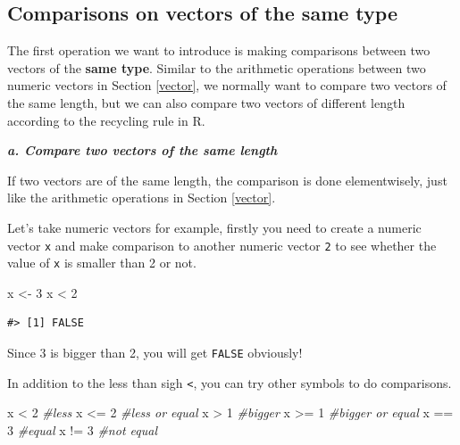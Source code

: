 \documentclass[
]{book}
\newenvironment{Shaded}{\begin{snugshade}}{\end{snugshade}}
\newcommand{\CommentTok}[1]{\textcolor[rgb]{0.56,0.35,0.01}{\textit{#1}}}
\newcommand{\DecValTok}[1]{\textcolor[rgb]{0.00,0.00,0.81}{#1}}
\newcommand{\NormalTok}[1]{#1}
\newcommand{\OtherTok}[1]{\textcolor[rgb]{0.56,0.35,0.01}{#1}}
\newcommand{\SpecialCharTok}[1]{\textcolor[rgb]{0.00,0.00,0.00}{#1}}
\begin{document}
\hypertarget{comparisons-on-vectors-of-the-same-type}{%
\subsection{Comparisons on vectors of the same type}\label{comparisons-on-vectors-of-the-same-type}}

The first operation we want to introduce is making comparisons between two vectors of the \textbf{same type}. Similar to the arithmetic operations between two numeric vectors in Section \ref{vector}, we normally want to compare two vectors of the same length, but we can also compare two vectors of different length according to the recycling rule in R.

\textbf{\emph{a. Compare two vectors of the same length}}

If two vectors are of the same length, the comparison is done elementwisely, just like the arithmetic operations in Section \ref{vector}.

Let's take numeric vectors for example, firstly you need to create a numeric vector \texttt{x} and make comparison to another numeric vector \texttt{2} to see whether the value of \texttt{x} is smaller than 2 or not.

\begin{Shaded}
\begin{Highlighting}[]
\NormalTok{x }\OtherTok{\textless{}{-}} \DecValTok{3}
\NormalTok{x }\SpecialCharTok{\textless{}} \DecValTok{2}
\end{Highlighting}
\end{Shaded}

\begin{verbatim}
#> [1] FALSE
\end{verbatim}

Since 3 is bigger than 2, you will get \texttt{FALSE} obviously!

In addition to the less than sigh \texttt{\textless{}}, you can try other symbols to do comparisons.

\begin{Shaded}
\begin{Highlighting}[]
\NormalTok{x }\SpecialCharTok{\textless{}} \DecValTok{2}      \CommentTok{\#less}
\NormalTok{x }\SpecialCharTok{\textless{}=} \DecValTok{2}     \CommentTok{\#less or equal}
\NormalTok{x }\SpecialCharTok{\textgreater{}} \DecValTok{1}      \CommentTok{\#bigger}
\NormalTok{x }\SpecialCharTok{\textgreater{}=} \DecValTok{1}     \CommentTok{\#bigger or equal}
\NormalTok{x }\SpecialCharTok{==} \DecValTok{3}     \CommentTok{\#equal}
\NormalTok{x }\SpecialCharTok{!=} \DecValTok{3}     \CommentTok{\#not equal}
\end{Highlighting}
\end{Shaded}
\end{document}
